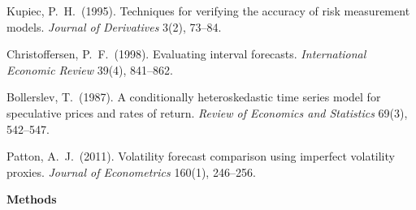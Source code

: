 \documentclass[10pt]{article}
\begin{document}
{\begin{enumerate}[label={\textbf{[\arabic*]}},leftmargin=2.8em,itemsep=4pt,parsep=0pt,topsep=2pt]
\item \hypertarget{R:34}{}%
  Kupiec, P.\ H.\ (1995). Techniques for verifying the accuracy of risk measurement models. \textit{Journal of Derivatives} 3(2), 73--84.

\item \hypertarget{R:35}{}%
  Christoffersen, P.\ F.\ (1998). Evaluating interval forecasts. \textit{International Economic Review} 39(4), 841--862.

\item \hypertarget{R:36}{}%
  Bollerslev, T.\ (1987). A conditionally heteroskedastic time series model for speculative prices and rates of return. \textit{Review of Economics and Statistics} 69(3), 542--547.

\item \hypertarget{R:37}{}%
  Patton, A.\ J.\ (2011). Volatility forecast comparison using imperfect volatility proxies. \textit{Journal of Econometrics} 160(1), 246--256.

\end{enumerate}
}

\clearpage

\begin{tcolorbox}[
  colback=NavyBg, colframe=NavyBg!60!black, arc=4pt,
  left=8pt, right=8pt, top=4pt, bottom=4pt,
  before skip=0pt, after skip=10pt]
{\large\bfseries\color{Navy} Methods}
\end{tcolorbox}
\end{document}

